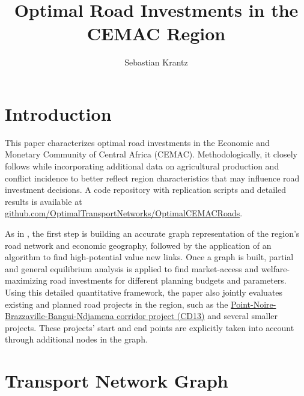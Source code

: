 \documentclass[a4paper]{article}
\title{\textbf{Optimal Road Investments in the CEMAC Region}}
\author{Sebastian Krantz}
\begin{document}
\maketitle

\section{Introduction}

This paper characterizes optimal road investments in the Economic and Monetary Community of Central Africa (CEMAC). Methodologically, it closely follows \citet{krantz2024optimal} while incorporating additional data on agricultural production and conflict incidence to better reflect region characteristics that may influence road investment decisions. A code repository with replication scripts and detailed results is available at \href{https://github.com/OptimalTransportNetworks/OptimalCEMACRoads}{github.com/OptimalTransportNetworks/OptimalCEMACRoads}. \newline 

As in \citet{krantz2024optimal}, the first step is building an accurate graph representation of the region's road network and economic geography, followed by the application of an algorithm to find high-potential value new links. Once a graph is built, partial and general equilibrium analysis is applied to find market-access and welfare-maximizing road investments for different planning budgets and parameters. 
Using this detailed quantitative framework, the paper also jointly evaluates existing and planned road projects in the region, such as the \href{https://www.afdb.org/en/documents/ppm-rca-projet-de-developpement-du-corridor-de-transport-multimodal-pointe-noire-brazzaville-bangui-ndjamena-cd13-phase-1}{Point-Noire-Brazzaville-Bangui-Ndjamena corridor project (CD13)} and several smaller projects. These projects' start and end points are explicitly taken into account through additional nodes in the graph. %

\section{Transport Network Graph}
\end{document}
